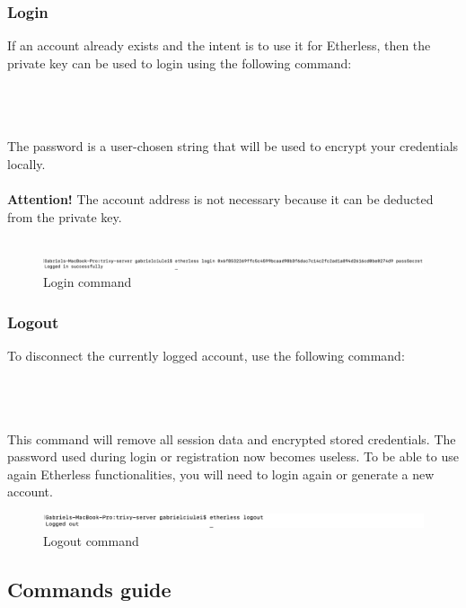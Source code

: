 \subsubsection{Login}
If an account already exists and the intent is to use it for Etherless, then the private key can be used to login using the following command:\\\\
\centerline{}\\\\
The password is a user-chosen string that will be used to encrypt your credentials locally.\\\\
\textbf{Attention!} The account address is not necessary because it can be deducted from the private key.\\\\
\begin{figure}[h]
	\begin{center}
	\includegraphics[width=\textwidth]{res/img/login.png}
	\caption{Login command}
	\end{center}
\end{figure}
\subsubsection{Logout}
To disconnect the currently logged account, use the following command:\\\\
\centerline{}\\\\
This command will remove all session data and encrypted stored credentials. The password used during login or registration now becomes useless. To be able to use again Etherless functionalities, you will need to login again or generate a new account.\\
\begin{figure}[h]
	\centering
	\includegraphics[width=\textwidth]{res/img/logout.png}
	\caption{Logout command}
\end{figure}
\newpage
\subsection{Commands guide}
